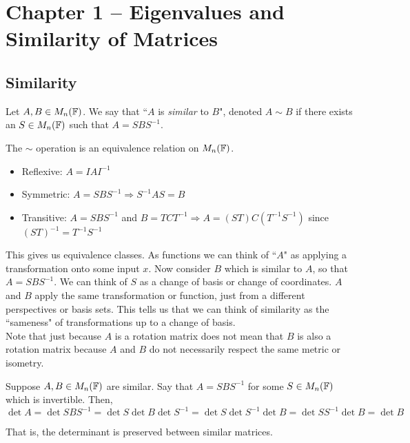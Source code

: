 \section{Chapter 1 -- Eigenvalues and Similarity of Matrices}

\subsection{Similarity}
\begin{definition}[Similar]
\label{def:similar}
Let $A, B \in M_n(\mathbb F)$. We say that ``$A$ is \textit{similar} to $B$", denoted $A \sim B$ if there exists an $S \in M_n(\mathbb F)$ such that $A = SBS^{-1}$.
\end{definition}

\begin{remark*}
The $\sim$ operation is an equivalence relation on $M_n(\mathbb F)$.
\begin{itemize}
    \item Reflexive: $A = IAI^{-1}$
    \item Symmetric: $A = SBS^{-1} \Longrightarrow S^{-1}AS = B$
    \item Transitive: $A = SBS^{-1}$ and $B = TCT^{-1} \Longrightarrow A = (ST)C(T^{-1}S^{-1})$ since $(ST)^{-1} = T^{-1}S^{-1}$
\end{itemize}

\noindent This gives us equivalence classes. As functions we can think of ``$A$" as applying a transformation onto some input $x$. Now consider $B$ which is similar to $A$, so that $A = SBS^{-1}$. We can think of $S$ as a change of basis or change of coordinates. $A$ and $B$ apply the same transformation or function, just from a different perspectives or basis sets. This tells us that we can think of similarity as the ``sameness" of transformations up to a change of basis. \\

\noindent Note that just because $A$ is a rotation matrix does not mean that $B$ is also a rotation matrix because $A$ and $B$ do not necessarily respect the same metric or isometry.
\end{remark*}

\begin{note*}
Suppose $A, B \in M_n(\mathbb F)$ are similar. Say that $A = SBS^{-1}$ for some $S \in M_n(\mathbb F)$ which is invertible. Then,
$$
\det A = \det SBS^{-1} = \det S \det B \det S^{-1} = \det S \det S^{-1} \det B = \det SS^{-1} \det B = \det B
$$

That is, the determinant is preserved between similar matrices.
\end{note*}

